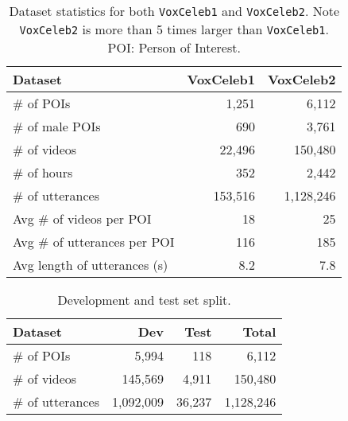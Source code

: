 \documentclass[a4paper]{article}
\def\aftertab{\vspace{-22pt}}
\begin{document}
\begin{table}
\footnotesize
\centering
\begin{tabular}{ l  r  r  }
  \textbf{Dataset} &  \textbf{VoxCeleb1} &  \textbf{VoxCeleb2} \\ \hline  
 \# of POIs & 1,251 & 6,112 \\ 
  \#  of male POIs & 690 & 3,761  \\ 
    \#  of videos & 22,496 & 150,480\\ 
    \#  of hours & 352 & 2,442\\ 
\#  of utterances & 153,516  & 1,128,246 \\ 
Avg \# of videos per POI & 18 & 25  \\ 
Avg \# of utterances per POI& 116 & 185 \\ 
Avg length of utterances (s) & 8.2 & 7.8\\ 

\end{tabular} 
\vspace{3pt}

\caption{Dataset statistics for both {\tt VoxCeleb1} and {\tt VoxCeleb2}. Note {\tt VoxCeleb2} is more than 5 times larger than {\tt VoxCeleb1}. POI: Person  of Interest.}
\label{table:data_stats}
\normalsize
\aftertab
\vspace{7pt}
\end{table}

\begin{table}
\footnotesize
\centering
\begin{tabular}{ l  r  r  r }

  \textbf{Dataset} &  \textbf{Dev} &  \textbf{Test} &  \textbf{Total}  \\ \hline  
 \# of POIs & 5,994 & 118 & 6,112 \\ 
    \#  of videos & 145,569 & 4,911 & 150,480\\ 
\#  of utterances & 1,092,009 & 36,237 & 1,128,246 \\ 

\end{tabular} 
\vspace{3pt}

\caption{Development and test set split.}
\label{table:set_stats}
\normalsize
\aftertab
\vspace{-8pt}
\end{table}
\end{document}
